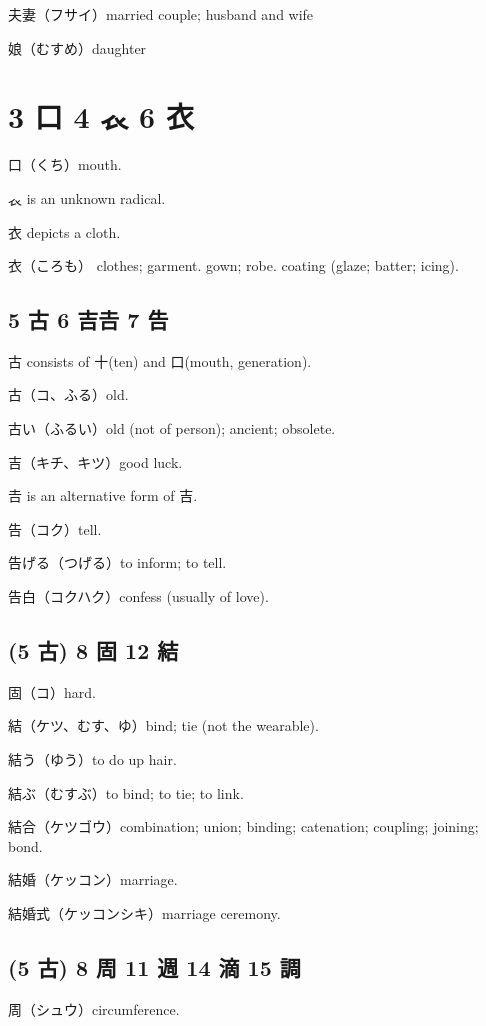 夫妻（フサイ）married couple; husband and wife

娘（むすめ）daughter

\section{3 口 4 𧘇 6 衣}

口（くち）mouth.

𧘇 is an unknown radical.

衣 depicts a cloth.

衣（ころも）
clothes;
garment. gown;
robe. coating (glaze; batter; icing).

\subsection{5 古 6 吉𠮷 7 告}

古 consists of 十(ten) and 口(mouth, generation).

古（コ、ふる）old.

古い（ふるい）old (not of person); ancient; obsolete.

吉（キチ、キツ）good luck.

𠮷 is an alternative form of 吉.

告（コク）tell.

告げる（つげる）to inform; to tell.

告白（コクハク）confess (usually of love).

\subsection{(5 古) 8 固 12 結}

固（コ）hard.

結（ケツ、むす、ゆ）bind; tie (not the wearable).

結う（ゆう）to do up hair.

結ぶ（むすぶ）to bind; to tie; to link.

結合（ケツゴウ）combination; union; binding; catenation; coupling; joining; bond.

結婚（ケッコン）marriage.

結婚式（ケッコンシキ）marriage ceremony.

\subsection{(5 古) 8 周 11 週 14 滴 15 調}

周（シュウ）circumference.

